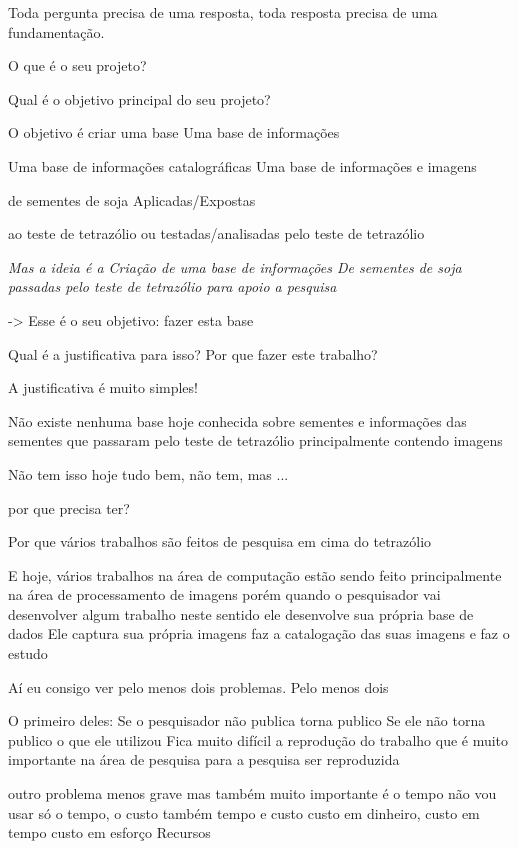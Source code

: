 Toda pergunta precisa de uma resposta, toda resposta precisa de uma fundamentação.



O que é o seu projeto?%

Qual é o objetivo principal do seu projeto? %


O objetivo é criar uma base
Uma base de informações

Uma base de informações catalográficas
Uma base de informações e imagens

de sementes de soja
Aplicadas/Expostas

ao teste de tetrazólio
ou testadas/analisadas pelo teste de tetrazólio


\emph{Mas a ideia é a Criação de uma base de informações De sementes de soja passadas pelo teste de tetrazólio para apoio a pesquisa}


-> Esse é o seu objetivo: fazer esta base %

Qual é a justificativa para isso? %
Por que fazer este trabalho?



A justificativa é muito simples! %


Não existe nenhuma base hoje conhecida sobre sementes e informações das sementes que passaram pelo teste de tetrazólio principalmente contendo imagens %

Não tem isso hoje
tudo bem, não tem, mas ...

por que precisa ter? %


Por que vários trabalhos são feitos de pesquisa em cima do tetrazólio %

E hoje, vários trabalhos na área de computação estão sendo feito principalmente na área de processamento de imagens
porém quando o pesquisador vai desenvolver algum trabalho
neste sentido ele desenvolve sua própria base de dados
Ele captura sua própria imagens faz a catalogação das suas imagens e faz o estudo


Aí eu consigo ver pelo  menos dois problemas. Pelo menos dois

O primeiro deles: %
Se o pesquisador não publica torna publico
Se ele não torna publico o que ele utilizou
Fica muito difícil a reprodução do trabalho
que é muito importante na área de pesquisa
para a pesquisa ser reproduzida


outro problema menos grave %
mas também muito importante
é o tempo
não vou usar só o tempo, o custo também
tempo e custo
custo em dinheiro, custo em tempo
custo em esforço
Recursos %


